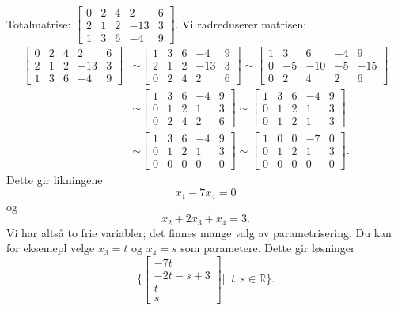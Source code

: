 \documentclass[notitlepage,a4paper,12pt,norsk]{IMFeksamen}
\newcommand{\vvvv}[4]{\begin{bmatrix} #1 \\ #2 \\ #3 \\ #4 \end{bmatrix}}
\newcommand{\0}{\V{0}}
\newcommand{\oppgslutt}{
\begin{center}
\pgfornament[width=6cm]{88}
\end{center}
}
\newenvironment{losning}{\begin{oppgave}}{\oppgslutt\end{oppgave}}
\begin{document}
\begin{losning}
Totalmatrise:
$
\begin{bmatrix}
0 & 2 & 4 &   2 & 6 \\
2 & 1 & 2 & -13 & 3 \\
1 & 3 & 6 &  -4 & 9
\end{bmatrix}
$.
Vi radreduserer matrisen:
\begin{align*}
\begin{bmatrix}
0 & 2 & 4 &   2 & 6 \\
2 & 1 & 2 & -13 & 3 \\
1 & 3 & 6 &  -4 & 9
\end{bmatrix}
&\sim 
\begin{bmatrix}
1 & 3 & 6 &  -4 & 9 \\
2 & 1 & 2 & -13 & 3 \\
0 & 2 & 4 &   2 & 6
\end{bmatrix}
\sim
\begin{bmatrix}
1 & 3 & 6 &  -4 & 9 \\
0 & -5 & -10 & -5 & -15 \\
0 & 2 & 4 &   2 & 6
\end{bmatrix}\\
&\sim 
\begin{bmatrix}
1 & 3 & 6 &  -4 & 9 \\
0 & 1 & 2 & 1 & 3 \\
0 & 2 & 4 &   2 & 6
\end{bmatrix}
\sim
\begin{bmatrix}
1 & 3 & 6 &  -4 & 9 \\
0 & 1 & 2 & 1 & 3 \\
0 & 1 & 2 & 1 & 3
\end{bmatrix}\\
&\sim 
\begin{bmatrix}
1 & 3 & 6 &  -4 & 9 \\
0 & 1 & 2 & 1 & 3 \\
0 & 0 & 0 &  0 & 0
\end{bmatrix}
\sim
\begin{bmatrix}
1 & 0 & 0 &  -7 & 0 \\
0 & 1 & 2 & 1 & 3 \\
0 & 0 & 0 &  0 & 0
\end{bmatrix}.
\end{align*}
Dette gir likningene 
$$x_1-7x_4=0$$
og $$x_2+2x_3+x_4=3.$$
Vi har altså to frie variabler; det finnes mange valg av parametrisering. Du kan for eksemepl velge $x_3=t$ og $x_4=s$ som parametere. Dette gir løsninger
$$\{\vvvv{-7t}{-2t-s+3}{t}{s}|\;\; t,s \in \mathbb{R}\}.$$
\end{losning}
\end{document}
